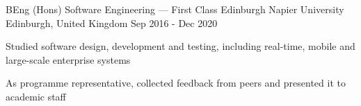 \begin{cventries}
  \cventry
    {BEng (Hons) Software Engineering --- First Class}
    {Edinburgh Napier University}
    {Edinburgh, United Kingdom}
    {Sep 2016 - Dec 2020}
    {
      \begin{cvitems}
        \item {Studied software design, development and testing, including real-time, mobile and large-scale enterprise systems}
        \item {As programme representative, collected feedback from peers and presented it to academic staff}
      \end{cvitems}
    }
\end{cventries}
